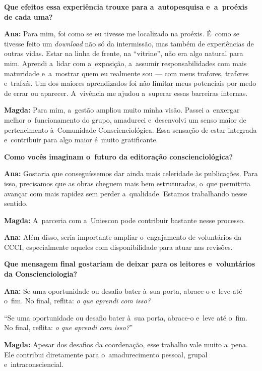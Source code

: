 \documentclass{gescons}
\begin{document}
\begin{multicols}{2}
\textbf{Que efeitos essa experiência trouxe para a~autopesquisa e~a~proéxis de cada uma?}

\textbf{Ana:} Para mim, foi como se eu tivesse me localizado na proéxis. É~como se tivesse feito um \emph{download} não só da intermissão, mas também de experiências de outras vidas. Estar na linha de frente, na ``vitrine'', não era algo natural para mim. Aprendi a~lidar com a~exposição, a~assumir responsabilidades com mais maturidade e~a~mostrar quem eu realmente sou --- com meus traf\emph{o}res, traf\emph{a}res e~traf\emph{ai}s. Um dos maiores aprendizados foi não limitar meus potenciais por medo de errar ou aparecer. A~vivência me ajudou a~superar essas barreiras internas.

\textbf{Magda:} Para mim, a~gestão ampliou muito minha visão. Passei a~enxergar melhor o~funcionamento do grupo, amadureci e~desenvolvi um senso maior de pertencimento à~Comunidade Conscienciológica. Essa sensação de estar integrada e~contribuir para algo maior é~muito gratificante.

\textbf{Como vocês imaginam o~futuro da editoração conscienciológica?}

\textbf{Ana:} Gostaria que conseguíssemos dar ainda mais celeridade às publicações. Para isso, precisamos que as obras cheguem mais bem estruturadas, o~que permitiria avançar com mais rapidez sem perder a~qualidade. Estamos trabalhando nesse sentido.

\textbf{Magda:} A~parceria com a~Uniescon pode contribuir bastante nesse processo.

\textbf{Ana:} Além disso, seria importante ampliar o~engajamento de voluntários da CCCI, especialmente aqueles com disponibilidade para atuar nas revisões.

\textbf{Que mensagem final gostariam de deixar para os leitores e~voluntários da Conscienciologia?}

\textbf{Ana:} Se uma oportunidade ou desafio bater à~sua porta, abrace-o e~leve até o~fim. No final, reflita: \emph{o que aprendi com isso?}

\begin{pullquote}
``Se uma oportunidade ou desafio bater à~sua porta, abrace-o e~leve até o~fim. No final, reflita: \emph{o que aprendi com isso?}''
\end{pullquote}

\textbf{Magda:} Apesar dos desafios da coordenação, esse trabalho vale muito a~pena. Ele contribui diretamente para o~amadurecimento pessoal, grupal e~intraconsciencial.


\end{multicols}
\end{document}
